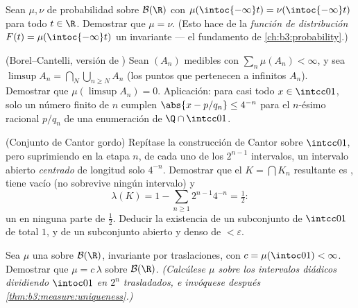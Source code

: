 \begin{exercise}[$\star\star$]\label{exo:b3:measure:3}
Sean $\mu, \nu$  de probabilidad
sobre $\mathcal B(\R)$ con
$\mu(\intoc{-\infty}t) = \nu(\intoc{-\infty}t)$ para todo $t \in \R$.
Demostrar que $\mu = \nu$. (Esto hace de la \emph{función de
distribución} $F(t) = \mu(\intoc{-\infty}t)$ un invariante
 --- el fundamento de
\cref{ch:b3:probability}.)
\end{exercise}

\begin{exercise}[$\star\star$]\label{exo:b3:measure:4}
(Borel--Cantelli, versión de )
Sean $(A_n)$ medibles con $\sum_n\mu(A_n) < \infty$, y sea
$\limsup A_n =
\bigcap_N\bigcup_{n\geq N}A_n$ (los puntos que pertenecen a infinitos
$A_n$). Demostrar que $\mu(\limsup A_n) = 0$. Aplicación: para casi todo
$x \in \intcc01$, solo un número finito de $n$ cumplen
$\abs{x - p/q_n} \leq 4^{-n}$ para el $n$-ésimo racional $p/q_n$ de una
enumeración de
$\Q\cap\intcc01$.
\end{exercise}

\begin{exercise}[$\star\star$]\label{exo:b3:measure:5}
(Conjunto de Cantor gordo) Repítase la construcción de Cantor sobre
$\intcc01$, pero suprimiendo en la etapa $n$, de cada uno de los
$2^{n-1}$ intervalos, un intervalo abierto \emph{centrado} de longitud
solo $4^{-n}$. Demostrar que el $K = \bigcap K_n$ resultante es
, tiene
 vacío (no sobrevive ningún
intervalo) y
\[
\lambda(K) = 1 - \sum_{n\geq1}2^{n-1}4^{-n} = \tfrac12 :
\]
un  en ninguna parte de
 $\frac12$. Deducir la existencia
de un subconjunto \emph{} de
$\intcc01$ de  total $1$, y de un
subconjunto abierto y denso de 
$< \varepsilon$.
\end{exercise}

\begin{exercise}[$\star\star$]\label{exo:b3:measure:6}
Sea $\mu$ una  sobre
$\mathcal B(\R)$, invariante por traslaciones, con
$c = \mu(\intoc01) < \infty$. Demostrar que $\mu =
c\,\lambda$ sobre $\mathcal B(\R)$. \emph{(Calcúlese $\mu$ sobre los
intervalos diádicos dividiendo $\intoc01$ en $2^n$ trasladados, e
invóquese después
\cref{thm:b3:measure:uniqueness}.)}
\end{exercise}

